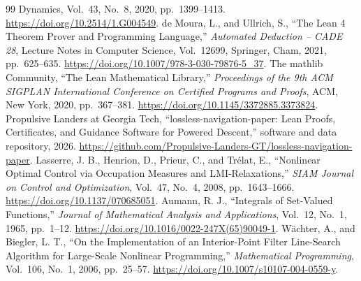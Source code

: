 \begin{thebibliography}{99}
{Dynamics}, Vol.~43, No.~8, 2020, pp.~1399--1413. \url{https://doi.org/10.2514/1.G004549}.
 de Moura, L., and Ullrich, S., ``The Lean 4 Theorem Prover and Programming Language,'' \emph{Automated Deduction --
CADE 28}, Lecture Notes in Computer Science, Vol.~12699, Springer, Cham, 2021, pp.~625--635. \url{https://doi.org/10.1007/978-3-030-79876-5_37}.
 The mathlib Community, ``The Lean Mathematical Library,'' \emph{Proceedings of the 9th ACM SIGPLAN International
Conference on Certified Programs and Proofs}, ACM, New York, 2020, pp.~367--381. \url{https://doi.org/10.1145/3372885.3373824}.
 Propulsive Landers at Georgia Tech, ``lossless-navigation-paper: Lean Proofs, Certificates, and Guidance Software for
Powered Descent,'' software and data repository, 2026. \url{https://github.com/Propulsive-Landers-GT/lossless-navigation-paper}.
 Lasserre, J. B., Henrion, D., Prieur, C., and Tr\'elat, E., ``Nonlinear Optimal Control via Occupation Measures
and LMI-Relaxations,'' \emph{SIAM Journal on Control and Optimization}, Vol.~47, No.~4, 2008, pp.~1643--1666.
\url{https://doi.org/10.1137/070685051}.
 Aumann, R. J., ``Integrals of Set-Valued Functions,'' \emph{Journal of Mathematical Analysis and Applications},
Vol.~12, No.~1, 1965, pp.~1--12. \url{https://doi.org/10.1016/0022-247X(65)90049-1}.
 W\"achter, A., and Biegler, L. T., ``On the Implementation of an Interior-Point Filter Line-Search Algorithm for
Large-Scale Nonlinear Programming,'' \emph{Mathematical Programming}, Vol.~106, No.~1, 2006, pp.~25--57. \url{https://doi.org/10.1007/s10107-004-0559-y}.
\end{thebibliography}

